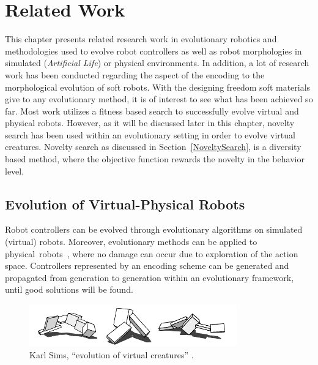 
\chapter{Related Work} %

\label{Related Work} %


This chapter presents related research work in evolutionary robotics and methodologies used to evolve robot controllers as well as robot morphologies in simulated (\emph{Artificial Life}) or physical environments. In addition, a lot of research work has been conducted regarding the aspect of the encoding to the morphological evolution of soft robots. With the designing freedom soft materials give to any evolutionary method, it is of interest to see what has been achieved so far. Most work utilizes a fitness based search to successfully evolve virtual and physical robots. However, as it will be discussed later in this chapter, novelty search has been used within an evolutionary setting in order to evolve virtual creatures. Novelty search as discussed in Section~\ref{NoveltySearch}, is a diversity based method, where the objective function rewards the novelty in the behavior level.


\section{Evolution of Virtual-Physical Robots}

Robot controllers can be evolved through evolutionary algorithms on simulated (virtual) robots. Moreover, evolutionary methods can be applied to physical~robots~\citep{nolfi1994evolve}, where no damage can occur due to exploration of the action space. Controllers represented by an encoding scheme can be generated and propagated from generation to generation within an evolutionary framework, until good solutions will be found.

\begin{figure}[b!]
\centering
\includegraphics[width=0.8\textwidth]{../Figures/Misc/evolvingVirtualCreatures.png}
\caption{Karl Sims, ``evolution of virtual creatures'' \citep{sims1994evolving}.}
\label{fig:karlSims}
\end{figure}

